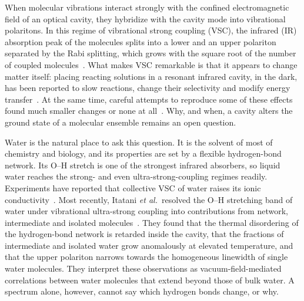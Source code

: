 \documentclass[aps,prb,reprint,superscriptaddress,nofootinbib,floatfix]{revtex4-2}
\begin{document}
When molecular vibrations interact strongly with the confined electromagnetic field of
an optical cavity, they hybridize with the cavity mode into vibrational polaritons. In
this regime of vibrational strong coupling (VSC), the infrared (IR) absorption peak of
the molecules splits into a lower and an upper polariton separated by the Rabi
splitting, which grows with the square root of the number of coupled
molecules~\cite{Shalabney2015,Thomas2016}. What makes VSC remarkable is that it appears
to change matter itself: placing reacting solutions in a resonant infrared cavity, in
the dark, has been reported to slow reactions, change their selectivity and modify
energy transfer~\cite{Thomas2016,Thomas2019,Xiang2020,Ahn2023}. At the same time,
careful attempts to reproduce some of these effects found much smaller changes or none
at all~\cite{Imperatore2021,Wiesehan2021}. Why, and when, a cavity alters the ground
state of a molecular ensemble remains an open question.

Water is the natural place to ask this question. It is the solvent of most of
chemistry and biology, and its properties are set by a flexible hydrogen-bond network.
Its O--H stretch is one of the strongest infrared absorbers, so liquid water reaches
the strong- and even ultra-strong-coupling regimes readily. Experiments have reported
that collective VSC of water raises its ionic conductivity~\cite{Fukushima2022}. Most
recently, Itatani \textit{et al.}\ resolved the O--H stretching band of water under
vibrational ultra-strong coupling into contributions from network, intermediate and
isolated molecules~\cite{Itatani2026}. They found that the thermal disordering of the
hydrogen-bond network is retarded inside the cavity, that the fractions of
intermediate and isolated water grow anomalously at elevated temperature, and that the
upper polariton narrows towards the homogeneous linewidth of single water molecules.
They interpret these observations as vacuum-field-mediated correlations between water
molecules that extend beyond those of bulk water. A spectrum alone, however, cannot say
which hydrogen bonds change, or why.
\end{document}
